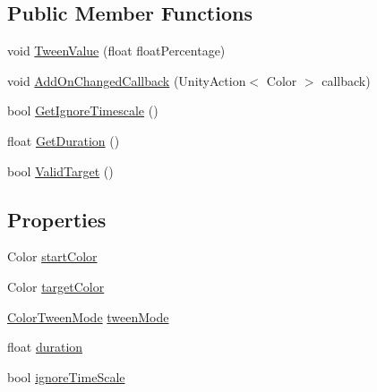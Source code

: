 \subsection*{Public Member Functions}
\begin{DoxyCompactItemize}
\item 
void \mbox{\hyperlink{struct_t_m_pro_1_1_color_tween_aa2ab2acdd602a7f7c73c179d4b0b92f5}{Tween\+Value}} (float float\+Percentage)
\item 
void \mbox{\hyperlink{struct_t_m_pro_1_1_color_tween_a5a3af510dc44b3ad3c8973bb93197961}{Add\+On\+Changed\+Callback}} (Unity\+Action$<$ Color $>$ callback)
\item 
bool \mbox{\hyperlink{struct_t_m_pro_1_1_color_tween_a836616b26c0730957c7a2e1d340356fb}{Get\+Ignore\+Timescale}} ()
\item 
float \mbox{\hyperlink{struct_t_m_pro_1_1_color_tween_ad68d38055abd7079732e93a83746f30b}{Get\+Duration}} ()
\item 
bool \mbox{\hyperlink{struct_t_m_pro_1_1_color_tween_adab4fef0982d1c37120c45baa1bf1111}{Valid\+Target}} ()
\end{DoxyCompactItemize}
\subsection*{Properties}
\begin{DoxyCompactItemize}
\item 
Color \mbox{\hyperlink{struct_t_m_pro_1_1_color_tween_a22d5f15683397db24c9fa7ba47e32a11}{start\+Color}}
\item 
Color \mbox{\hyperlink{struct_t_m_pro_1_1_color_tween_af6f6e8d0db57003afbaa35865364f342}{target\+Color}}
\item 
\mbox{\hyperlink{struct_t_m_pro_1_1_color_tween_a22465a1cc95d87abd9ca22c2dd021fbd}{Color\+Tween\+Mode}} \mbox{\hyperlink{struct_t_m_pro_1_1_color_tween_aef6eb969db69ffdcef35e0f13f2e0dc2}{tween\+Mode}}
\item 
float \mbox{\hyperlink{struct_t_m_pro_1_1_color_tween_aa20e0c9773e9a8e50d0feae7c4e599a0}{duration}}
\item 
bool \mbox{\hyperlink{struct_t_m_pro_1_1_color_tween_ad8ec0ae32214f07d8e7538636bdbdb08}{ignore\+Time\+Scale}}
\end{DoxyCompactItemize}


